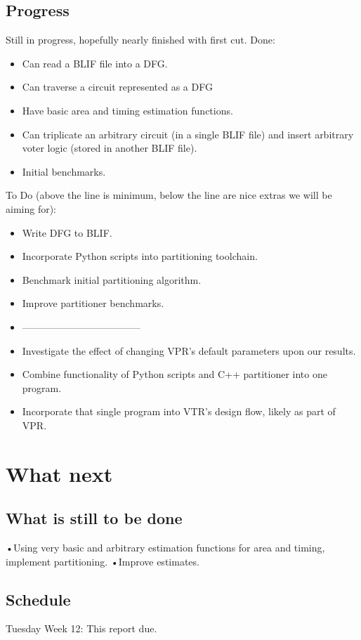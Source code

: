 \documentclass[12pt,drafta4paper,oneside]{memoir} %
\begin{document}
\section{Progress}
Still in progress, hopefully nearly finished with first cut.
Done:
\begin{itemize}
    \item Can read a \ac{BLIF} file into a \ac{DFG}.
    \item Can traverse a circuit represented as a \ac{DFG}
    \item Have basic area and timing estimation functions.
    \item Can triplicate an arbitrary circuit (in a single \ac{BLIF} file) and insert arbitrary voter logic (stored in another \ac{BLIF} file).
    \item Initial benchmarks.
\end{itemize}
To Do (above the line is minimum, below the line are nice extras we will be aiming for):
\begin{itemize}
    \item Write \ac{DFG} to \ac{BLIF}.
    \item Incorporate Python scripts into partitioning toolchain.
    \item Benchmark initial partitioning algorithm.
    \item Improve partitioner benchmarks.
    \item ------------------------------------
    \item Investigate the effect of changing \ac{VPR}'s default parameters upon our results.
    \item Combine functionality of Python scripts and C++ partitioner into one program.
    \item Incorporate that single program into \ac{VTR}'s design flow, likely as part of \ac{VPR}.
\end{itemize}
\chapter{What next}
\section{What is still to be done}
•Using very basic and arbitrary estimation functions for area and timing, implement partitioning.
•Improve estimates.
\section{Schedule}
Tuesday Week 12: This report due.
\end{document}

